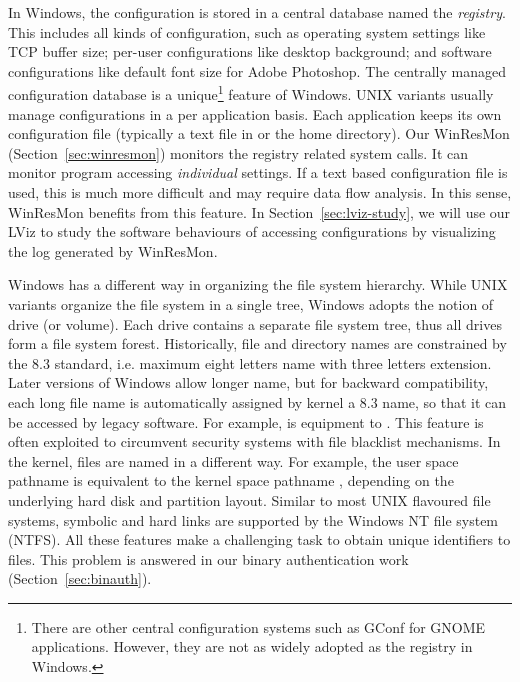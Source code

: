 In Windows, the configuration is stored in a central database named the
{\em registry}.
This includes all kinds of configuration, such as
operating system settings like TCP buffer size;
per-user configurations like desktop background;
and software configurations like default font size
for Adobe Photoshop.
The centrally managed configuration database is a unique\footnote{
There are other central configuration systems such as
GConf for GNOME applications.
However, they are not as widely adopted as the registry in Windows.
} feature of Windows.
UNIX variants usually manage configurations in a per application basis.
Each application keeps its own configuration file (typically a
text file in  or the home directory).
Our WinResMon (Section~\ref{sec:winresmon}) monitors the registry
related system calls.
It can monitor program accessing {\em individual} settings.
If a text based configuration file is used, this is much more difficult
and may require data flow analysis.
In this sense, WinResMon benefits from this feature.
In Section~\ref{sec:lviz-study}, we will use our LViz to study the
software behaviours of accessing configurations by visualizing the
log generated by WinResMon.

Windows has a different way in organizing the file system hierarchy.
While UNIX variants organize the file system in a single tree,
Windows adopts the notion of drive (or volume).
Each drive contains a separate file system tree, thus all drives
form a file system forest.
Historically, file and directory names are constrained by the 8.3
standard,
i.e. maximum eight letters name with three letters extension.
Later versions of Windows allow longer name, but for backward
compatibility, each long file name is automatically assigned by kernel a
8.3 name, so that it can be accessed by legacy software.
For example,  is equipment to .
This feature is often exploited to circumvent security systems with
file blacklist mechanisms.
In the kernel, files are named in a different way.
For example, the user space pathname 
is equivalent to the kernel space pathname
,
depending on the underlying hard disk and partition layout.
Similar to most UNIX flavoured file systems, symbolic and hard links
are supported by the Windows NT file system (NTFS).
All these features make a challenging task to obtain unique identifiers to files.
This problem is answered in our binary authentication work (Section~\ref{sec:binauth}).

